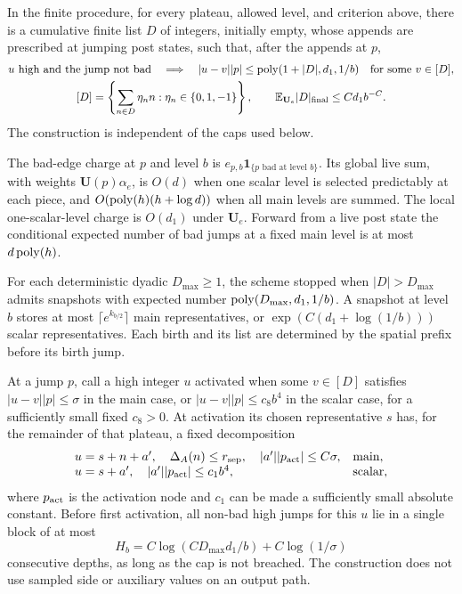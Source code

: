 \begin{proposition}\label{prop:capture}
In the finite procedure, for every plateau, allowed level, and criterion
above, there is a cumulative finite list $D$ of integers, initially empty,
whose appends are prescribed at jumping post states, such that, after the
appends at $p$,
\begin{equation}\label{eq:source-14}
 \begin{gathered}
 u\text{ high and the jump not bad}\quad\Longrightarrow\quad
 |u-v||p|\le\operatorname{poly}(1+|D|,d_1,1/b)
       \quad\text{for some }v\in[D],\\
 [D]=\left\{\sum_{n\in D}\eta_n n:\eta_n\in\{0,1,-1\}\right\},
 \qquad \mathbb E_{\mathbf U_e}|D|_{\rm final}\le C d_1 b^{-C}.
 \end{gathered}
\end{equation}
The construction is independent of the caps used below.

The bad-edge charge at $p$ and level $b$ is
$e_{p,b}\mathbf1_{\{p\text{ bad at level }b\}}$. Its global live sum,
with weights $\mathbf U(p)\alpha_e$, is $O(d)$ when one scalar level is
selected predictably at each piece, and
$O(\operatorname{poly}(h)(h+\log d))$ when all main levels are summed. The local
one-scalar-level charge is $O(d_1)$ under $\mathbf U_e$. Forward from a
live post state the conditional expected number of bad jumps at a fixed
main level is at most $d\operatorname{poly}(h)$.

For each deterministic dyadic $D_{\max}\ge1$, the scheme stopped when
$|D|>D_{\max}$ admits snapshots with expected number
$\operatorname{poly}(D_{\max},d_1,1/b)$. A snapshot at level $b$ stores at most
$\lceil e^{k_{b/2}}\rceil$ main representatives, or
$\exp(C(d_1+\log(1/b)))$ scalar representatives. Each birth and its list
are determined by the spatial prefix before its birth jump.

At a jump $p$, call a high integer $u$ activated when some $v\in[D]$
satisfies $|u-v||p|\le\sigma$ in the main case, or
$|u-v||p|\le c_8b^4$ in the scalar case, for a sufficiently small fixed
$c_8>0$. At activation its chosen representative $s$
has, for the remainder of that plateau, a fixed decomposition
\[
 \begin{array}{ll}
 u=s+n+a',\quad \Delta_A(n)\le r_{\rm sep},\quad
          |a'||p_{\rm act}|\le C\sigma,&\text{main},\\
 u=s+a',\quad |a'||p_{\rm act}|\le c_1b^4,&\text{scalar},
 \end{array}
\]
where $p_{\rm act}$ is the activation node and $c_1$ can be made a
sufficiently small absolute constant. Before first activation, all
non-bad high jumps for this $u$ lie in a single block of at most
\[
 H_b=C\log(CD_{\max}d_1/b)+C\log(1/\sigma)
\]
consecutive depths, as long as the cap is not breached. The construction
does not use sampled side or auxiliary values on an output path.
\end{proposition}

